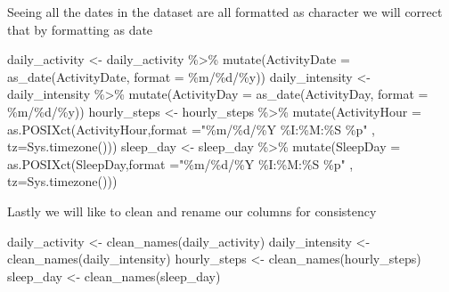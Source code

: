 \documentclass[
]{article}
\newenvironment{Shaded}{\begin{snugshade}}{\end{snugshade}}
\newcommand{\AttributeTok}[1]{\textcolor[rgb]{0.77,0.63,0.00}{#1}}
\newcommand{\FunctionTok}[1]{\textcolor[rgb]{0.00,0.00,0.00}{#1}}
\newcommand{\NormalTok}[1]{#1}
\newcommand{\OtherTok}[1]{\textcolor[rgb]{0.56,0.35,0.01}{#1}}
\newcommand{\SpecialCharTok}[1]{\textcolor[rgb]{0.00,0.00,0.00}{#1}}
\newcommand{\StringTok}[1]{\textcolor[rgb]{0.31,0.60,0.02}{#1}}
\begin{document}
Seeing all the dates in the dataset are all formatted as character we
will correct that by formatting as date

\begin{Shaded}
\begin{Highlighting}[]
\NormalTok{daily\_activity }\OtherTok{\textless{}{-}}\NormalTok{ daily\_activity }\SpecialCharTok{\%\textgreater{}\%} 
  \FunctionTok{mutate}\NormalTok{(}\AttributeTok{ActivityDate =} \FunctionTok{as\_date}\NormalTok{(ActivityDate, }\AttributeTok{format =} \StringTok{\textquotesingle{}\%m/\%d/\%y\textquotesingle{}}\NormalTok{))}
\NormalTok{daily\_intensity }\OtherTok{\textless{}{-}}\NormalTok{ daily\_intensity }\SpecialCharTok{\%\textgreater{}\%} 
  \FunctionTok{mutate}\NormalTok{(}\AttributeTok{ActivityDay =} \FunctionTok{as\_date}\NormalTok{(ActivityDay, }\AttributeTok{format =} \StringTok{\textquotesingle{}\%m/\%d/\%y\textquotesingle{}}\NormalTok{))}
\NormalTok{hourly\_steps }\OtherTok{\textless{}{-}}\NormalTok{ hourly\_steps }\SpecialCharTok{\%\textgreater{}\%} 
  \FunctionTok{mutate}\NormalTok{(}\AttributeTok{ActivityHour =} \FunctionTok{as.POSIXct}\NormalTok{(ActivityHour,}\AttributeTok{format =}\StringTok{"\%m/\%d/\%Y \%I:\%M:\%S \%p"}\NormalTok{ , }\AttributeTok{tz=}\FunctionTok{Sys.timezone}\NormalTok{()))}
\NormalTok{sleep\_day }\OtherTok{\textless{}{-}}\NormalTok{ sleep\_day }\SpecialCharTok{\%\textgreater{}\%} 
  \FunctionTok{mutate}\NormalTok{(}\AttributeTok{SleepDay =} \FunctionTok{as.POSIXct}\NormalTok{(SleepDay,}\AttributeTok{format =}\StringTok{"\%m/\%d/\%Y \%I:\%M:\%S \%p"}\NormalTok{ , }\AttributeTok{tz=}\FunctionTok{Sys.timezone}\NormalTok{()))}
\end{Highlighting}
\end{Shaded}

Lastly we will like to clean and rename our columns for consistency

\begin{Shaded}
\begin{Highlighting}[]
\NormalTok{daily\_activity }\OtherTok{\textless{}{-}} \FunctionTok{clean\_names}\NormalTok{(daily\_activity) }
\NormalTok{daily\_intensity }\OtherTok{\textless{}{-}} \FunctionTok{clean\_names}\NormalTok{(daily\_intensity) }
\NormalTok{hourly\_steps }\OtherTok{\textless{}{-}} \FunctionTok{clean\_names}\NormalTok{(hourly\_steps)}
\NormalTok{sleep\_day }\OtherTok{\textless{}{-}} \FunctionTok{clean\_names}\NormalTok{(sleep\_day)}
\end{Highlighting}
\end{Shaded}
\end{document}
